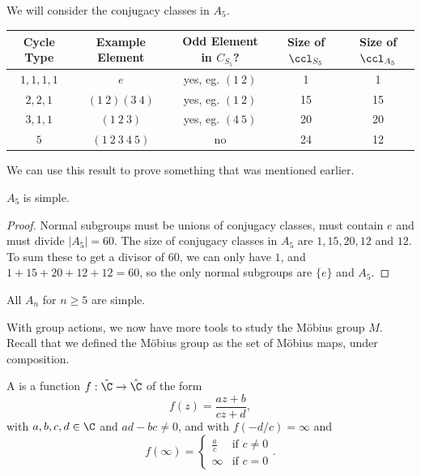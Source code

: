 \begin{example}
	We will consider the conjugacy classes in $A_5$. 
	\begin{center}
		\begin{tabular}{@{}ccccc@{}}
		\toprule
		Cycle Type & Example Element & Odd Element in $C_{S_5}$? & Size of $\ccl_{S_5}$ & Size of $\ccl_{A_5}$ \\ \midrule
		$1, 1, 1, 1$ & $e$ & yes, eg. $(1\ 2)$ & 1 & 1\\
		$2, 2, 1$ & $(1\ 2)(3\ 4)$ & yes, eg. $(1\ 2)$ & 15 & 15 \\
		$3, 1, 1$ & $(1\ 2\ 3)$ & yes, eg. $(4\ 5)$ & 20 & 20\\
		$5$ & $(1\ 2\ 3\ 4\ 5)$ & no & 24 & 12\\
		\bottomrule
		\end{tabular}
	\end{center}
\end{example}

We can use this result to prove something that was mentioned earlier.

\begin{theorem}
	$A_5$ is simple.
\end{theorem}
\begin{proof}
	Normal subgroups must be unions of conjugacy classes, must contain $e$ and must divide $|A_5| = 60$. The size of conjugacy classes in $A_5$ are $1, 15, 20 ,12$ and $12$. To sum these to get a divisor of 60, we can only have $1$, and $1 + 15 + 20 + 12 + 12 = 60$, so the only normal subgroups are $\{e\}$ and $A_5$.
\end{proof}

\begin{remark}
	All $A_n$ for $n \geq 5$ are simple.
\end{remark}



With group actions, we now have more tools to study the Möbius group $M$. Recall that we defined the Möbius group as the set of Möbius maps, under composition. 
\begin{definition*}
	A  is a function $f : \hat{\C} \rightarrow \hat{\C}$ of the form
	$$
	f(z) = \frac{az + b}{cz + d},
	$$
	with $a, b, c, d \in \C$ and $ad - bc \neq 0$, and with $f(-d/c) = \infty$ and 
	$$
	f(\infty) = \begin{cases}
	   \frac{a}{c} &\mbox{if } c \neq 0 \\
	   \infty &\mbox{if } c = 0
	   \end{cases}.
	$$
\end{definition*}

